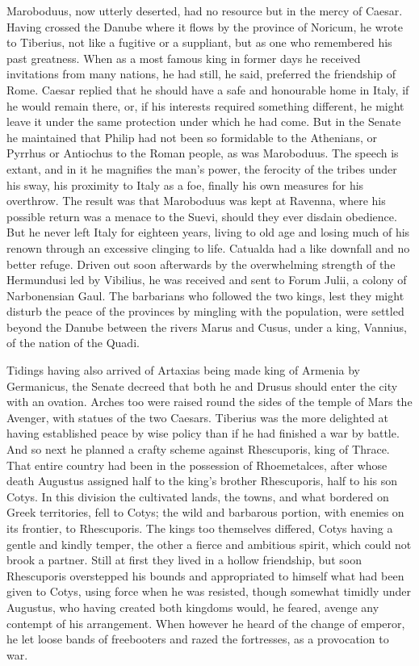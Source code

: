 
Maroboduus, now utterly deserted, had no resource but in the mercy of Caesar. Having crossed the Danube where it flows by the province of Noricum, he wrote to Tiberius, not like a fugitive or a suppliant, but as one who remembered his past greatness. When as a most famous king in former days he received invitations from many nations, he had still, he said, preferred the friendship of Rome. Caesar replied that he should have a safe and honourable home in Italy, if he would remain there, or, if his interests required something different, he might leave it under the same protection under which he had come. But in the Senate he maintained that Philip had not been so formidable to the Athenians, or Pyrrhus or Antiochus to the Roman people, as was Maroboduus. The speech is extant, and in it he magnifies the man's power, the ferocity of the tribes under his sway, his proximity to Italy as a foe, finally his own measures for his overthrow. The result was that Maroboduus was kept at Ravenna, where his possible return was a menace to the Suevi, should they ever disdain obedience. But he never left Italy for eighteen years, living to old age and losing much of his renown through an excessive clinging to life. Catualda had a like downfall and no better refuge. Driven out soon afterwards by the overwhelming strength of the Hermundusi led by Vibilius, he was received and sent to Forum Julii, a colony of Narbonensian Gaul. The barbarians who followed the two kings, lest they might disturb the peace of the provinces by mingling with the population, were settled beyond the Danube between the rivers Marus and Cusus, under a king, Vannius, of the nation of the Quadi.


Tidings having also arrived of Artaxias being made king of Armenia by Germanicus, the Senate decreed that both he and Drusus should enter the city with an ovation. Arches too were raised round the sides of the temple of Mars the Avenger, with statues of the two Caesars. Tiberius was the more delighted at having established peace by wise policy than if he had finished a war by battle. And so next he planned a crafty scheme against Rhescuporis, king of Thrace. That entire country had been in the possession of Rhoemetalces, after whose death Augustus assigned half to the king's brother Rhescuporis, half to his son Cotys. In this division the cultivated lands, the towns, and what bordered on Greek territories, fell to Cotys; the wild and barbarous portion, with enemies on its frontier, to Rhescuporis. The kings too themselves differed, Cotys having a gentle and kindly temper, the other a fierce and ambitious spirit, which could not brook a partner. Still at first they lived in a hollow friendship, but soon Rhescuporis overstepped his bounds and appropriated to himself what had been given to Cotys, using force when he was resisted, though somewhat timidly under Augustus, who having created both kingdoms would, he feared, avenge any contempt of his arrangement. When however he heard of the change of emperor, he let loose bands of freebooters and razed the fortresses, as a provocation to war.

